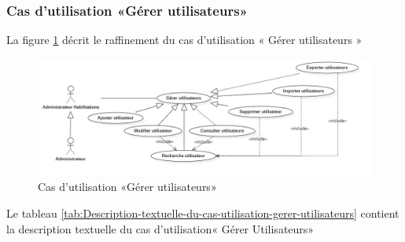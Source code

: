 \subsubsection{Cas d’utilisation «Gérer utilisateurs»}
La figure \ref{fig:usecase-gestion-users} décrit le raffinement du cas d’utilisation « Gérer utilisateurs »
\begin{figure}[H]
	\centering
	\includegraphics[width=1\linewidth]{"img/conception/usecases/sprint 1/usecase-gestion-users"}
	\caption[Cas d’utilisation «Gérer utilisateurs»]{Cas d’utilisation «Gérer utilisateurs»}
	\label{fig:usecase-gestion-users}
\end{figure}
Le tableau \ref{tab:Description-textuelle-du-cas-utilisation-gerer-utilisateurs} contient la description textuelle du cas d’utilisation« Gérer Utilisateurs»\\

